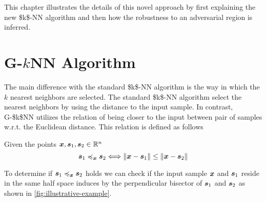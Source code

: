 \medskip

\noindent This chapter illustrates the details of this novel approach by first explaining the new \acs{$k$-NN} algorithm and then how the robustness to an adversarial region is inferred.

\section {\texorpdfstring{G-$k$NN Algorithm}{G-kNN Algorithm}}
\label{sec:G-kNN-algorithm}

The main difference with the standard \acs{$k$-NN} algorithm is the way in which the $k$ nearest neighbors are selected. The standard \acs{$k$-NN} algorithm select the nearest neighbors by using the distance to the input sample. In contrast, \acs{G-$k$NN} utilizes the relation of being closer to the input between pair of samples w.r.t. the Euclidean distance. This relation is defined as follows

\begin{definition}
\label{def:closer-to-input}
  Given the points $\vinput, \sample[1], \sample[2] \in \mathbb{R}^n $
  \[
    \pre{\sample[1]}{\sample[2]} \Longleftrightarrow
    \norm{\vinput - \sample[1]} \le \norm{\vinput - \sample[2]}
  \]
\end{definition}

\noindent To determine if $\pre{\sample[1]}{\sample[2]}$ holds we can check if the input sample $\vinput$ and $\sample[1]$ reside in the same half space induces by the perpendicular bisector of $\sample[1]$ and $\sample[2]$ as shown in  \autoref{fig:illustrative-example}.

